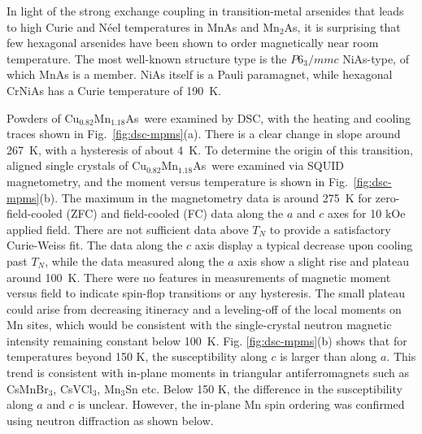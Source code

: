 \documentclass[10pt,doublespacing,edeposit]{uiucthesis2020}
\newcommand*{\cumnas}{Cu$_{0.82}$Mn$_{1.18}$As}
\begin{document}
\begin{mainmatter}
In light of the strong exchange coupling in transition-metal arsenides that leads to high Curie and N\'{e}el temperatures in MnAs and Mn$_2$As, it is surprising that few hexagonal arsenides have been shown to order magnetically near room temperature. The most well-known structure type is the $P6_3/mmc$  NiAs-type, of which MnAs is a member. NiAs itself is a Pauli paramagnet,\cite{nozue_specific_1997} while hexagonal CrNiAs has a Curie temperature of 190~K.\cite{stadnik_magnetization_2008}

Powders of \cumnas\ were examined by DSC, with the heating and cooling traces shown in Fig.\ \ref{fig:dsc-mpms}(a).
There is a clear change in slope around 267~K, with a hysteresis of about 4~K.
To determine the origin of this transition, aligned single crystals of \cumnas\ were examined via SQUID magnetometry, and the moment versus temperature is shown in Fig.\ \ref{fig:dsc-mpms}(b).
The maximum in the magnetometry data is around 275~K for zero-field-cooled (ZFC) and field-cooled (FC) data along the $a$ and $c$ axes {\color{black} for 10 kOe applied field}. There are not sufficient data above $T_N$ to provide a satisfactory Curie-Weiss fit.
The data along the $c$ axis display a typical decrease upon cooling past $T_N$, while the data measured along the $a$ axis show a slight rise and plateau around 100~K.
There were no features in measurements of magnetic moment versus field to indicate spin-flop transitions or any hysteresis. The small plateau could arise from decreasing itineracy and a leveling-off of the local moments on Mn sites, which would be consistent with the single-crystal neutron magnetic intensity remaining constant below 100~K. 
{\color{black}  Fig. \ref{fig:dsc-mpms}(b) shows that for temperatures beyond 150 K, the susceptibility along $c$ is larger than along $a$. This trend is consistent with in-plane moments in triangular antiferromagnets such as CsMnBr$_3$, CsVCl$_3$, Mn$_3$Sn etc.\cite{Brown_1990,Kotyuzhanskii1991,Hirakawa1983,Duan2015} Below 150 K, the difference in the susceptibility along $a$ and $c$ is unclear. However, the in-plane Mn spin ordering was confirmed using neutron diffraction as shown below.}



\end{mainmatter}
\end{document}
